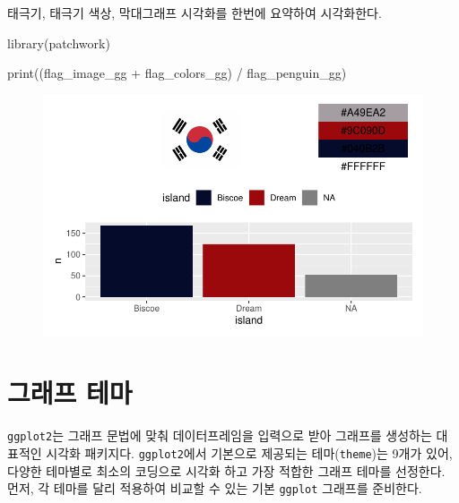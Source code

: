 \documentclass[
  letterpaper,
]{book}
\newenvironment{Shaded}{\begin{snugshade}}{\end{snugshade}}
\newcommand{\FunctionTok}[1]{\textcolor[rgb]{0.28,0.35,0.67}{#1}}
\newcommand{\NormalTok}[1]{\textcolor[rgb]{0.00,0.23,0.31}{#1}}
\newcommand{\SpecialCharTok}[1]{\textcolor[rgb]{0.37,0.37,0.37}{#1}}
\begin{document}
태극기, 태극기 색상, 막대그래프 시각화를 한번에 요약하여 시각화한다.

\begin{Shaded}
\begin{Highlighting}[]
\FunctionTok{library}\NormalTok{(patchwork)}

\FunctionTok{print}\NormalTok{((flag\_image\_gg }\SpecialCharTok{+}\NormalTok{ flag\_colors\_gg) }\SpecialCharTok{/}\NormalTok{ flag\_penguin\_gg)}
\end{Highlighting}
\end{Shaded}

\begin{figure}[H]

{\centering \includegraphics{colors_files/figure-pdf/unnamed-chunk-9-1.pdf}

}

\end{figure}

\hypertarget{uxadf8uxb798uxd504-uxd14cuxb9c8}{%
\chapter{그래프 테마}\label{uxadf8uxb798uxd504-uxd14cuxb9c8}}

\texttt{ggplot2}는 그래프 문법에 맞춰 데이터프레임을 입력으로 받아
그래프를 생성하는 대표적인 시각화 패키지다. \texttt{ggplot2}에서
기본으로 제공되는 테마(\texttt{theme})는 9개가 있어, 다양한 테마별로
최소의 코딩으로 시각화 하고 가장 적합한 그래프 테마를 선정한다. 먼저, 각
테마를 달리 적용하여 비교할 수 있는 기본 \texttt{ggplot} 그래프를
준비한다.
\end{document}
